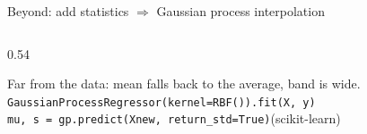 \documentclass[aspectratio=169]{beamer}
\begin{document}
\begin{frame}{Beyond: add statistics $\Rightarrow$ Gaussian process interpolation}
\begin{columns}[T]
\begin{column}{0.54\textwidth}

\vspace{-0.2em}
\footnotesize Far from the data: mean falls back to the average, band is wide.\\[0.2em]
\scriptsize\texttt{GaussianProcessRegressor(kernel=RBF()).fit(X, y)}\\
\texttt{mu, s = gp.predict(Xnew, return\_std=True)}\quad(scikit-learn)
\end{column}
\end{columns}
\end{frame}
\end{document}
